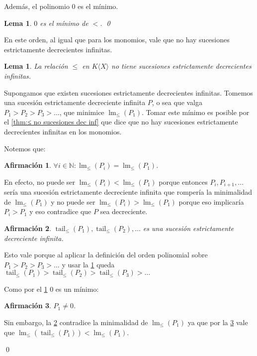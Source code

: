 \documentclass[12pt]{report}
\theoremstyle{customstyle}
\newtheorem{lemma}[theorem]{Lema}
\renewenvironment{proof}[1][\proofname]{{\noindent \bfseries #1: }}{\qed} %
\theoremstyle{factstyle}
\newtheorem{fact}{Afirmación}[theorem]
\DeclareMathOperator{\lm}{lm}
\DeclareMathOperator{\tail}{tail}
\begin{document}
Además, el polinomio $0$ es el mínimo.

\begin{lemma}\label{lemma:0 es mínimo}
  $0$ es el mínimo de $<$.
  \qed
\end{lemma}

En este orden, al igual que para los monomios, vale que no hay sucesiones estrictamente decrecientes infinitas.

\begin{lemma}\label{lemma:≤ en KX no sucesiones dec inf}
  La relación $≤$ en $K⟨X⟩$ no tiene sucesiones estrictamente decrecientes infinitas.
\end{lemma}
\begin{proof}
  Supongamos que existen sucesiones estrictamente decrecientes infinitas. Tomemos una sucesión estrictamente decreciente infinita $P$, o sea que valga $P_1 > P_2 > P_3 > …$, que minimice $\lm_≤(P_1)$. Tomar este mínimo es posible por el \cref{thm:≤ no sucesiones dec inf} que dice que no hay sucesiones estrictamente decrecientes infinitas en los monomios.

  Notemos que:

  \begin{fact}\label{fact:≤ en KX no sucesiones dec inf:1}
    $∀i ∈ ℕ : \lm_≤(P_i) = \lm_≤(P_1)$.
  \end{fact}
  En efecto, no puede ser $\lm_≤(P_i) < \lm_≤(P_1)$ porque entonces $P_i, P_{i + 1}, …$ sería una sucesión estrictamente decreciente infinita que rompería la minimalidad de $\lm_≤(P_1)$ y no puede ser $\lm_≤(P_i) > \lm_≤(P_1)$ porque eso implicaría $P_i > P_1$ y eso contradice que $P$ sea decreciente.

  \begin{fact}\label{fact:≤ en KX no sucesiones dec inf:2}
    $\tail_≤(P_1), \tail_≤(P_2), …$ es una sucesión estrictamente decreciente infinita.
  \end{fact}
  Esto vale porque al aplicar la definición del orden polinomial sobre $P_1 > P_2 > P_3 > …$ y usar la \cref{fact:≤ en KX no sucesiones dec inf:1} queda $\tail_≤(P_1) > \tail_≤(P_2) > \tail_≤(P_3) > …$

  Como por el \cref{lemma:0 es mínimo} $0$ es un mínimo:

  \begin{fact}\label{fact:≤ en KX no sucesiones dec inf:3}
    $P_1 ≠ 0$.
  \end{fact}

  Sin embargo, la \cref{fact:≤ en KX no sucesiones dec inf:2} contradice la minimalidad de $\lm_≤(P_1)$ ya que por la \cref{fact:≤ en KX no sucesiones dec inf:3} vale que $\lm_≤(\tail_≤(P_1)) < \lm_≤(P_1)$.

\end{proof}
\end{document}
